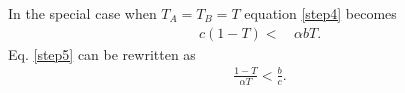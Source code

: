 \documentclass[12pt]{extarticle}
\begin{document}
In the special case when $T_A = T_B = T$ equation \eqref{step4} becomes
\begin{equation} 
\begin{split}\label{step5}
c(1-T) < & \, \alpha bT.
\end{split}
\end{equation}
Eq. \eqref{step5} can be rewritten as
\begin{equation} 
\begin{split}
 \frac{1-T}{\alpha T} < \frac{b}{c}.
\end{split}
\end{equation}
\end{document}
